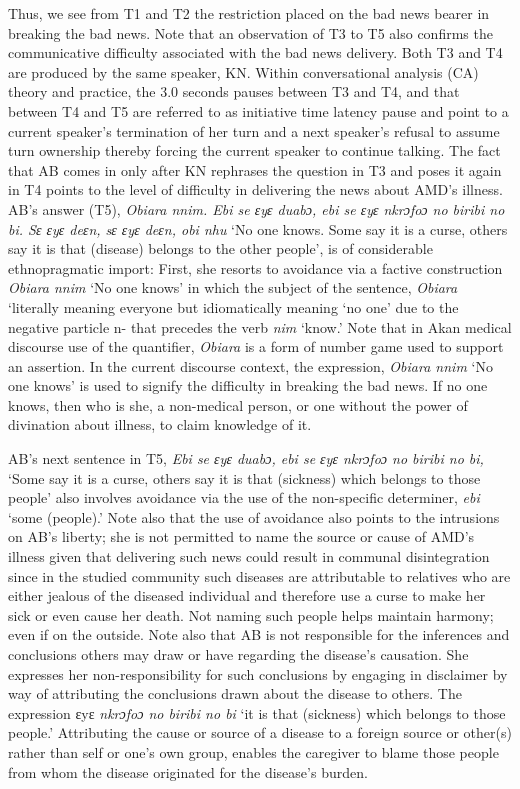 \documentclass[output=paper,colorlinks,citecolor=brown]{langscibook}
\begin{document}
Thus, we see from T1 and T2 the restriction placed on the bad news bearer in breaking the bad news. Note that an observation of T3 to T5 also confirms the communicative difficulty associated with the bad news delivery. Both T3 and T4 are produced by the same speaker, KN. Within conversational analysis (CA) theory and practice, the 3.0 seconds pauses between T3 and T4, and that between T4 and T5 are referred to as initiative time latency pause and point to a current speaker’s termination of her turn and a next speaker’s refusal to assume turn ownership thereby forcing the current speaker to continue talking. The fact that AB comes in only after KN rephrases the question in T3 and poses it again in T4 points to the level of difficulty in delivering the news about AMD’s illness. AB’s answer (T5), \textit{Obiara nnim. Ebi se ɛyɛ duabɔ, ebi se ɛyɛ nkrɔfoɔ no biribi no bi. Sɛ ɛyɛ deɛn, sɛ ɛyɛ deɛn, obi nhu} ‘No one knows. Some say it is a curse, others say it is that (disease) belongs to the other people’, is of considerable ethnopragmatic import: First, she resorts to avoidance via a factive construction \textit{Obiara nnim }‘No one knows’ in which the subject of the sentence, \textit{Obiara} ‘literally meaning everyone but idiomatically meaning ‘no one’ due to the negative particle n- that precedes the verb \textit{nim} ‘know.’ Note that in Akan medical discourse use of the quantifier, \textit{Obiara} is a form of number game used to support an assertion. In the current discourse context, the expression, \textit{Obiara nnim} ‘No one knows’ is used to signify the difficulty in breaking the bad news. If no one knows, then who is she, a non-medical person, or one without the power of divination about illness, to claim knowledge of it.

AB’s next sentence in T5, \textit{Ebi se ɛyɛ duabɔ, ebi se ɛyɛ nkrɔfoɔ no biribi no bi,} ‘Some say it is a curse, others say it is that (sickness) which belongs to those people’ also involves avoidance via the use of the non-specific determiner, \textit{ebi} ‘some (people).’ Note also that the use of avoidance also points to the intrusions on AB’s liberty; she is not permitted to name the source or cause of AMD’s illness given that delivering such news could result in communal disintegration since in the studied community such diseases are attributable to relatives who are either jealous of the diseased individual and therefore use a curse to make her sick or even cause her death. Not naming such people helps maintain harmony; even if on the outside. Note also that AB is not responsible for the inferences and conclusions others may draw or have regarding the disease’s causation. She expresses her non-responsibility for such conclusions by engaging in disclaimer by way of attributing the conclusions drawn about the disease to others. The expression ɛyɛ \textit{nkrɔfoɔ no biribi no bi} ‘it is that (sickness) which belongs to those people.’ Attributing the cause or source of a disease to a foreign source or other(s) rather than self or one’s own group, enables the caregiver to blame those people from whom the disease originated for the disease’s burden.
\end{document}
